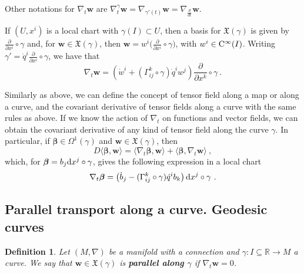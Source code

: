 \documentclass[12pt]{report}
\newtheorem{definition}[teor]{Definition}
\def\derpar#1#2{\frac{\partial{#1}}{\partial{#2}}}
\def\vf{\mathfrak X}
\def\d{{\rm d}}
\def\Real{\mathbb{R}}
\def\Cinfty{{\rm C}^\infty}
\begin{document}
Other notations for $\nabla_{t}\mathbf{w}$ are
$\nabla_{t}^{\gamma}\mathbf{w}=\nabla_{\gamma'(t)}\mathbf{w}=\nabla_{\frac{d}{d t}}\mathbf{w}$.

If $(U,x^i)$ is a local chart with $\gamma(I)\subset U$, 
then a basis for $\vf(\gamma)$ is given by  $\displaystyle\derpar{}{x^i}\circ\gamma$ and,
for $\mathbf{w}\in\vf(\gamma)$, then  $\mathbf{w}=w^{i}\Big(\displaystyle\derpar{}{x^i}\circ\gamma\Big)$,
with $w^{i}\in\Cinfty(I)$. Writing 
$\gamma'=\dot{q}^{i}\displaystyle\derpar{}{x^i}\circ\gamma$, 
we have that
$$
\nabla_{t}\mathbf{w}=\left(\dot{w}^{i}+(\Gamma_{ij}^{k}\circ\gamma)\dot{q}^{i}{w}^{j}\right){\frac{\partial}{\partial x^{k}}}\circ\gamma\ .
$$

Similarly as above, we can define the concept of tensor field along a map 
or along a curve, and the covariant derivative of tensor fields along a curve 
with the same rules as above. 
If we know the action of  $\nabla_{t}$ on functions and vector fields,
we can obtain the covariant derivative of any kind of tensor field 
along the curve $\gamma$.
In particular, if $ \boldsymbol{\beta}\in\Omega^{1}(\gamma)$ 
and $\mathbf{w}\in\vf(\gamma)$, then
$$
D\langle \boldsymbol{\beta},\mathbf{w}\rangle=\langle\nabla_{t} \boldsymbol{\beta},\mathbf{w}\rangle+\langle \boldsymbol{\beta},\nabla_{t}\mathbf{w}\rangle\ ,
$$
which, for $\boldsymbol{\beta}=b_{j}\d x^{j}\circ\gamma$, gives the following expression in a local chart
$$
\nabla_{t} \boldsymbol{\beta}=\left(\dot{b}_{j}-(\Gamma_{ij}^{k}\circ\gamma)\dot{q}^{i}{b}_{k}\right)\d x^{j}\circ\gamma\ .
$$


\subsection{Parallel transport along a curve. Geodesic curves}


\begin{definition}
Let $(M,\nabla)$ be a manifold with a connection
and $\gamma\colon I\subseteq\Real\to M$ a curve. 
We say that $\mathbf{w}\in\vf(\gamma)$ is \textbf{parallel along $\gamma$}
 if $\nabla_{t}\mathbf{w}=0$.
\end{definition}
\end{document}
